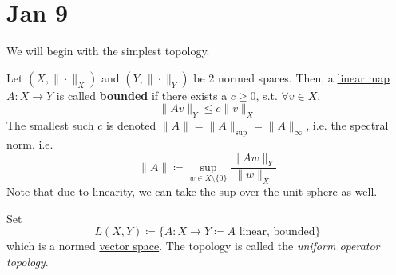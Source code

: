 \section{Jan 9} 

	We will begin with the simplest topology. 

  \begin{definition}
    \label{def:bounded-linear-operators}
    Let $(X, \|\cdot\|_X)$ and $(Y, \|\cdot\|_Y)$ be 2 normed spaces. Then, a \hyperref[lin-def:linear_map]{linear map} $A: X \to Y$ is called \textbf{bounded} if there exists a $c \geq 0$, s.t. $\forall v \in X$, 
    \begin{equation}
      \|Av \|_Y \leq c \|v\|_X
    \end{equation}
    The smallest such $c$ is denoted $\|A\| = \|A\|_{\mathrm{sup}} = \|A\|_\infty$, i.e. the spectral norm. i.e. 
    \begin{equation}
      \|A\| \coloneqq \sup_{w \in X \setminus \{0\}} \frac{\|Aw\|_Y}{\|w\|_X}
    \end{equation}
    Note that due to linearity, we can take the sup over the unit sphere as well. 
  \end{definition}

  Set 
  \begin{equation}
    L(X, Y) \coloneqq \{A : X \to Y \coloneq A \text{ linear, bounded}\}
  \end{equation}
  which is a normed \hyperref[lin-def:vector-space]{vector space}. The topology is called the \textit{uniform operator topology}. 


